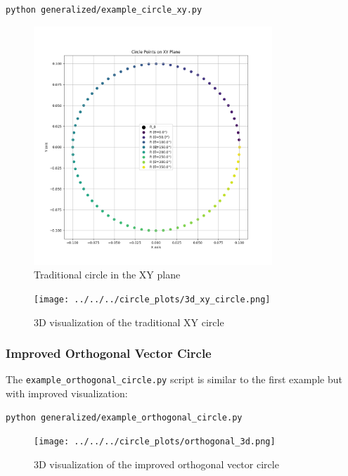 \begin{lstlisting}[language=bash]
python generalized/example_circle_xy.py
\end{lstlisting}

\begin{figure}[H]
    \centering
    \includegraphics[width=0.8\textwidth]{figures/xy_circle.png}
    \caption{Traditional circle in the XY plane}
    \label{fig:example_xy_circle}
\end{figure}

\begin{figure}[H]
    \centering
    \texttt{[image: ../../../circle\_plots/3d\_xy\_circle.png]}
    \caption{3D visualization of the traditional XY circle}
    \label{fig:example_3d_xy_circle}
\end{figure}

\subsubsection{Improved Orthogonal Vector Circle}

The \texttt{example\_orthogonal\_circle.py} script is similar to the first example but with improved visualization:

\begin{lstlisting}[language=bash]
python generalized/example_orthogonal_circle.py
\end{lstlisting}

\begin{figure}[H]
    \centering
    \texttt{[image: ../../../circle\_plots/orthogonal\_3d.png]}
    \caption{3D visualization of the improved orthogonal vector circle}
    \label{fig:example_orthogonal_3d}
\end{figure}


